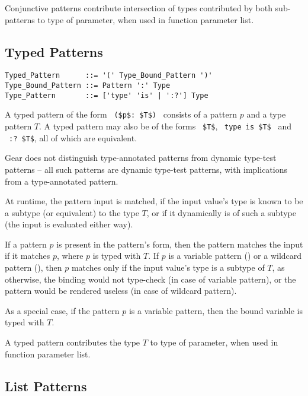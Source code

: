 Conjunctive patterns contribute intersection of types contributed by both sub-patterns to type of parameter, when used in function parameter list. 





\subsection{Typed Patterns}
\label{sec:typed-patterns}

\syntax\begin{lstlisting}
Typed_Pattern      ::= '(' Type_Bound_Pattern ')'
Type_Bound_Pattern ::= Pattern ':' Type
Type_Pattern       ::= ['type' 'is' | ':?'] Type
\end{lstlisting}

A typed pattern of the form ~\lstinline!($p$: $T$)!~ consists of a pattern $p$ and a type pattern $T$. A typed pattern may also be of the forms ~\lstinline!$T$!, ~\lstinline!type is $T$!~ and
~\lstinline!:? $T$!, all of which are equivalent. 

Gear does not distinguish type-annotated patterns from dynamic type-test patterns -- all such patterns are dynamic type-test patterns, with implications from a type-annotated pattern. 

At runtime, the pattern input is matched, if the input value's type is known to be a subtype (or equivalent) to the type $T$, or if it dynamically is of such a subtype (the input is evaluated either way). 

If a pattern $p$ is present in the pattern's form, then the pattern matches the input if it matches $p$, where $p$ is typed with $T$. If $p$ is a variable pattern () or a wildcard pattern (), then $p$ matches only if the input value's type is a subtype of $T$, as otherwise, the binding would not type-check (in case of variable pattern), or the pattern would be rendered useless (in case of wildcard pattern). 

As a special case, if the pattern $p$ is a variable pattern, then the bound variable is typed with $T$. 

A typed pattern contributes the type $T$ to type of parameter, when used in function parameter list. 





\subsection{List Patterns}
\label{sec:list-patterns}

